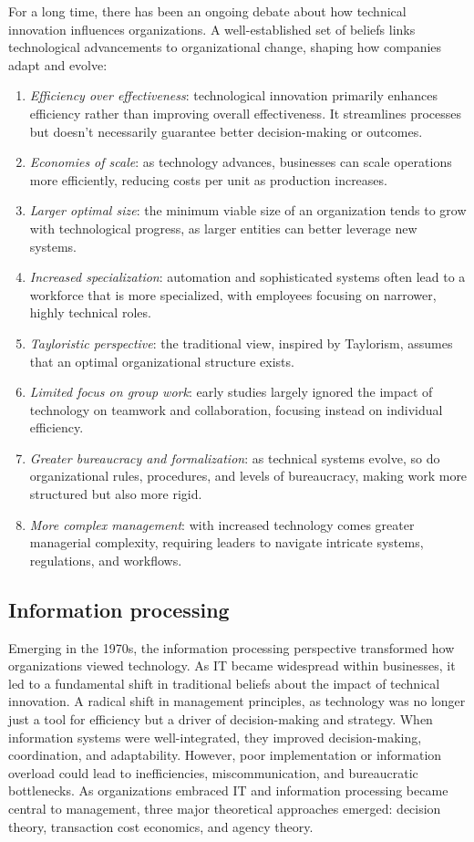 \noindent For a long time, there has been an ongoing debate about how technical innovation influences organizations. 
A well-established set of beliefs links technological advancements to organizational change, shaping how companies adapt and evolve:
\begin{enumerate}
    \item \textit{Efficiency over effectiveness}: technological innovation primarily enhances efficiency rather than improving overall effectiveness. 
        It streamlines processes but doesn't necessarily guarantee better decision-making or outcomes.
    \item \textit{Economies of scale}: as technology advances, businesses can scale operations more efficiently, reducing costs per unit as production increases.
    \item \textit{Larger optimal size}: the minimum viable size of an organization tends to grow with technological progress, as larger entities can better leverage new systems.
    \item \textit{Increased specialization}: automation and sophisticated systems often lead to a workforce that is more specialized, with employees focusing on narrower, highly technical roles.
    \item \textit{Tayloristic perspective}: the traditional view, inspired by Taylorism, assumes that an optimal organizational structure exists.
    \item \textit{Limited focus on group work}: early studies largely ignored the impact of technology on teamwork and collaboration, focusing instead on individual efficiency.
    \item \textit{Greater bureaucracy and formalization}: as technical systems evolve, so do organizational rules, procedures, and levels of bureaucracy, making work more structured but also more rigid.
    \item \textit{More complex management}: with increased technology comes greater managerial complexity, requiring leaders to navigate intricate systems, regulations, and workflows.
\end{enumerate}

\subsection{Information processing}
Emerging in the 1970s, the information processing perspective transformed how organizations viewed technology. 
As IT became widespread within businesses, it led to a fundamental shift in traditional beliefs about the impact of technical innovation.
A radical shift in management principles, as technology was no longer just a tool for efficiency but a driver of decision-making and strategy.
When information systems were well-integrated, they improved decision-making, coordination, and adaptability.
However, poor implementation or information overload could lead to inefficiencies, miscommunication, and bureaucratic bottlenecks.
As organizations embraced IT and information processing became central to management, three major theoretical approaches emerged: decision theory, transaction cost economics, and agency theory.
